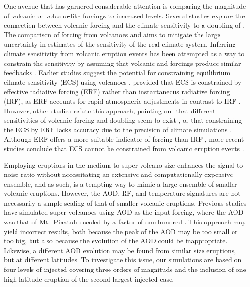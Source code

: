 \documentclass[draft]{agujournal2019}
\begin{document}
One avenue that has garnered considerable attention is comparing the magnitude of
volcanic or volcano-like forcings to increased  levels. Several studies explore
the connection between volcanic forcing and the climate sensitivity to a doubling of
\cite{boer2007,marvel2016,merlis2014,ollila2016,richardson2019,salvi2022,wigley2005}.
The comparison of forcing from volcanoes and  aims to mitigate the large
uncertainty in estimates of the sensitivity of the real climate system. Inferring
climate sensitivity from volcanic eruption events has been attempted as a way to
constrain the sensitivity \cite{boer2007} by assuming that volcanic and 
forcings produce similar feedbacks \cite{pauling2023}. Earlier studies suggest the
potential for constraining equilibrium cilmate sensitivity (ECS) using volcanoes
\cite{bender2010}, provided that ECS is constrained by effective radiative forcing (ERF)
rather than instantaneous radiative forcing (IRF), as ERF accounts for rapid atmospheric
adjustments in contrast to IRF \cite{richardson2019}. However, other studies refute this
approach, pointing out that different sensitivities of volcanic forcing and 
doubling seem to exist \cite{douglass2006}, or that constraining the ECS by ERF lacks
accuracy due to the precision of climate simulations \cite{boer2007,salvi2022}. Although
ERF offers a more suitable indicator of forcing than IRF
\cite{marvel2016,richardson2019}, more recent studies conclude that ECS cannot be
constrained from volcanic eruption events \cite{pauling2023}.

Employing eruptions in the medium to super-volcano size enhances the signal-to-noise
ratio without necessitating an extensive and computationally expensive ensemble, and as
such, is a tempting way to mimic a large ensemble of smaller volcanic eruptions.
However, the AOD, RF, and temperature signatures are not necessarily a simple scaling of
that of smaller volcanic eruptions. Previous studies have simulated super-volcanoes
using AOD as the input forcing, where the AOD was that of Mt.\ Pinatubo scaled by a
factor of one hundred \cite{jones2005}. This approach may yield incorrect results, both
because the peak of the AOD may be too small or too big, but also because the evolution
of the AOD could be inappropriate. Likewise, a different AOD evolution may be found from
similar size eruptions, but at different latitudes. To investigate this issue, our
simulations are based on four levels of injected  covering three orders of
magnitude and the inclusion of one high latitude eruption of the second largest injected
 case.
\end{document}
